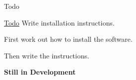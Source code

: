 \begin{DoxyRefDesc}{Todo}
\item[\hyperlink{todo__todo000013}{Todo}]Write installation instructions.
\begin{DoxyItemize}
\item First work out how to install the software.
\item Then write the instructions.
\end{DoxyItemize}\end{DoxyRefDesc}


{\bfseries Still in Development} 